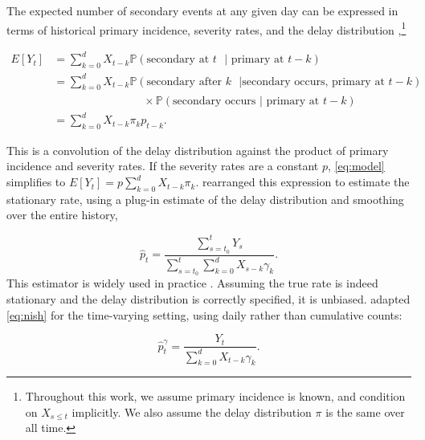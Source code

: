 \documentclass{article}
\begin{document}
The expected number of secondary events at any given day can be expressed in terms of historical primary incidence, severity rates, and the delay distribution \citep{fusedlasso,nishiura},\footnote{Throughout this work, we assume primary incidence is known, and condition on $X_{s\leq t}$ implicitly. We also assume the delay distribution $\pi$ is the same over all time.}

\begin{align}\label{eq:model}
    E[Y_t] &= \sum_{k=0}^d X_{t-k} \mathbb{P}(\text{secondary at $t$ }\vert\text{ primary at }t-k) \nonumber \\ %
            &= \sum_{k=0}^d X_{t-k} \mathbb{P}(\text{secondary after $k$ }\vert\text{secondary occurs, primary at }t-k) \nonumber \\
    &\qquad\qquad\qquad\qquad\times\mathbb{P}(\text{secondary occurs }\vert\text{ primary at $t-k$}) \nonumber \\
    &= \sum_{k=0}^d X_{t-k} \pi_k p_{t-k}.%
\end{align}

\noindent This is a convolution of the delay distribution against the product of primary incidence and severity rates. If the severity rates are a constant $p$, \eqref{eq:model} simplifies to $E[Y_t] = p\sum_{k=0}^d X_{t-k}\pi_k$. \citet{nishiura} rearranged this expression to estimate the stationary rate, using a plug-in estimate of the delay distribution and smoothing over the entire history,

\begin{equation}\label{eq:nish}
    \hat{p}_t = \frac{\sum_{s=t_0}^t Y_s}{\sum_{s=t_0}^t \sum_{k=0}^d X_{s-k}\gamma_k}.
\end{equation}
This estimator is widely used in practice \citep{nishiuraEx1, nishiuraEx2, Russell2020}. Assuming the true rate is indeed stationary and the delay distribution is correctly specified, it is unbiased. \citet{UKpaper} adapted \eqref{eq:nish} for the time-varying setting, using daily rather than cumulative counts:

\begin{equation}\label{eq:conv}
    \hat{p}_t^{\gamma} = \frac{Y_t}{\sum_{k=0}^d X_{t-k}\gamma_k}.%
\end{equation}
\end{document}
